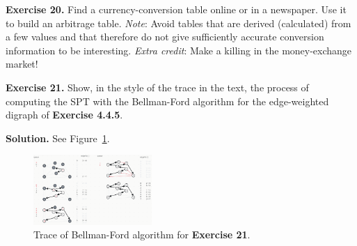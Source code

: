 \documentclass[12pt, a4paper]{article}
\newenvironment{ex}[2][Exercise]
{\par\medskip\noindent \textbf{#1 #2.}}
{\medskip}
\newenvironment{sol}[1][Solution]
{\par\medskip\noindent \textbf{#1.} }
{\medskip}
\begin{document}
	\begin{ex}{20}
		Find a currency-conversion table online or in a newspaper. Use it to build an
		arbitrage table. \emph{Note}: Avoid tables that are derived (calculated) from
		a few values and that therefore do not give sufficiently accurate conversion
		information to be interesting. \emph{Extra credit}: Make a killing in the
		money-exchange market!
	\end{ex}
	\begin{ex}{21}
		Show, in the style of the trace in the text, the process of computing the SPT with
		the Bellman-Ford algorithm for the edge-weighted digraph of \textbf{Exercise 4.4.5}.
	\end{ex}
	\begin{sol}
		See Figure~\ref{fig:ex-21-bf}.
		\begin{figure}
			\centering
			\includegraphics[width=0.4\textwidth]{exercise-21}
			\caption{Trace of Bellman-Ford algorithm for \textbf{Exercise 21}.}
			\label{fig:ex-21-bf}
		\end{figure}
	\end{sol}
	\pagebreak
	\printbibliography
\end{document}
